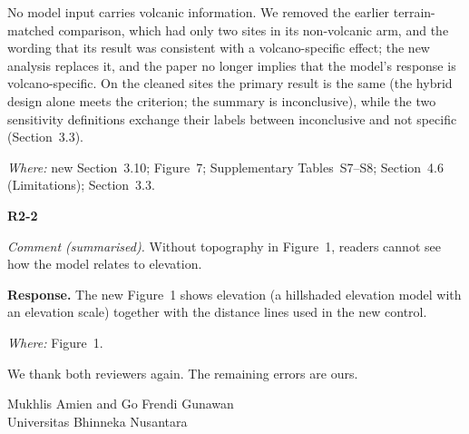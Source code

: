 \documentclass[11pt,a4paper]{article}
\newcommand{\comment}[1]{\par\noindent\textit{Comment (summarised).} #1\par}
\newcommand{\response}{\par\noindent\textbf{Response.} }
\newcommand{\where}[1]{\par\noindent\textit{Where:} #1\par\medskip}
\begin{document}
No model input carries volcanic information. We removed the earlier terrain-matched comparison, which had only two sites
in its non-volcanic arm, and the wording that its result was consistent with a volcano-specific effect; the new analysis
replaces it, and the paper no longer implies that the model's response is volcano-specific. On the cleaned sites the
primary result is the same (the hybrid design alone meets the criterion; the summary is inconclusive), while the two
sensitivity definitions exchange their labels between inconclusive and not specific (Section~3.3).
\where{new Section~3.10; Figure~7; Supplementary Tables~S7--S8; Section~4.6 (Limitations); Section~3.3.}

\textbf{R2-2}
\comment{Without topography in Figure~1, readers cannot see how the model relates to elevation.}
\response The new Figure~1 shows elevation (a hillshaded elevation model with an elevation scale) together with the
distance lines used in the new control.
\where{Figure~1.}

\bigskip
We thank both reviewers again. The remaining errors are ours.

\medskip
Mukhlis Amien and Go Frendi Gunawan\\
Universitas Bhinneka Nusantara
\end{document}
